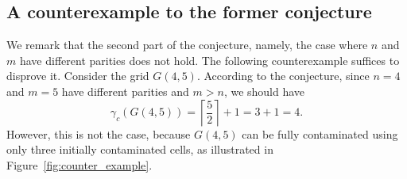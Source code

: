 \documentclass[letterpaper,12pt]{article}
\begin{document}
 

\subsection{A counterexample to the former conjecture}


    We  remark that the second part of the conjecture, namely, the case where $n$ and $m$ have different parities does not hold. The following counterexample suffices to disprove it. Consider the grid $G(4,5)$. According to the conjecture, since $n=4$ and $m=5$ have different parities and $m>n$, we should have
\[
\gamma_c(G(4,5)) = \left\lceil \frac{5}{2} \right\rceil + 1 = 3 + 1 = 4.
\]
However, this is not the case, because $G(4,5)$ can be fully contaminated using only three initially contaminated cells, as illustrated in Figure~\ref{fig:counter_example}.
\begin{figure}[H]
    \centering
    
 

\begin{tikzpicture}[scale=0.8pt,x=0.75pt,y=0.75pt,yscale=-1,xscale=1]


\end{tikzpicture}
\end{figure}
\end{document}
